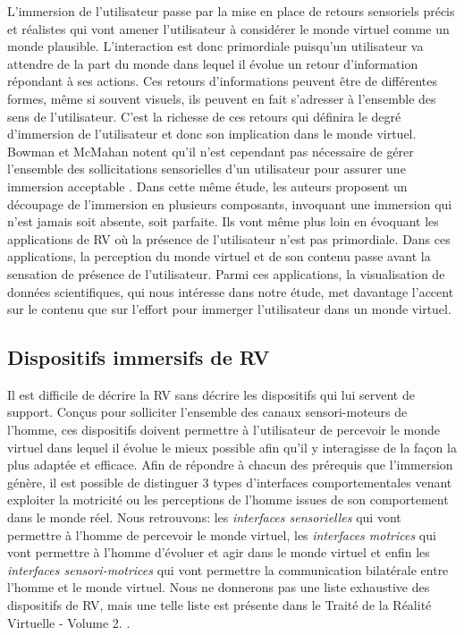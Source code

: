 L'immersion de l'utilisateur passe par la mise en place de retours sensoriels précis et réalistes qui vont amener l'utilisateur à considérer le monde virtuel comme un monde plausible. L'interaction est donc primordiale puisqu'un utilisateur va attendre de la part du monde dans lequel il évolue un retour d'information répondant à ses actions. Ces retours d'informations peuvent être de différentes formes, même si souvent visuels, ils peuvent en fait s'adresser à l'ensemble des sens de l'utilisateur. C'est la richesse de ces retours qui définira le degré d'immersion de l'utilisateur et donc son implication dans le monde virtuel. Bowman et McMahan notent qu'il n'est cependant pas nécessaire de gérer l'ensemble des sollicitations sensorielles d'un utilisateur pour assurer une immersion acceptable \cite{bowman_virtual_2007}. Dans cette même étude, les auteurs proposent un découpage de l'immersion en plusieurs composants, invoquant une immersion qui n'est jamais soit absente, soit parfaite. Ils vont même plus loin en évoquant les applications de RV où la présence de l'utilisateur n'est pas primordiale. Dans ces applications, la perception du monde virtuel et de son contenu passe avant la sensation de présence de l'utilisateur. Parmi ces applications, la visualisation de données scientifiques, qui nous intéresse dans notre étude, met davantage l'accent sur le contenu que sur l'effort pour immerger l'utilisateur dans un monde virtuel.

\subsection{Dispositifs immersifs de RV}

Il est difficile de décrire la RV sans décrire les dispositifs qui lui servent de support. Conçus pour solliciter l'ensemble des canaux sensori-moteurs de l'homme, ces dispositifs doivent permettre à l'utilisateur de percevoir le monde virtuel dans lequel il évolue le mieux possible afin qu'il y interagisse de la façon la plus adaptée et efficace.
Afin de répondre à chacun des prérequis que l'immersion génère, il est possible de distinguer 3 types d'interfaces comportementales venant exploiter la motricité ou les perceptions de l'homme issues de son comportement dans le monde réel.
Nous retrouvons: les \textit{interfaces sensorielles} qui vont permettre à l'homme de percevoir le monde virtuel, les \textit{interfaces motrices} qui vont permettre à l'homme d'évoluer et agir dans le monde virtuel et enfin les \textit{interfaces sensori-motrices} qui vont permettre la communication bilatérale entre l'homme et le monde virtuel.
Nous ne donnerons pas une liste exhaustive des dispositifs de RV, mais une telle liste est présente dans le Traité de la Réalité Virtuelle - Volume 2. \cite{fuchs2006traite}.

